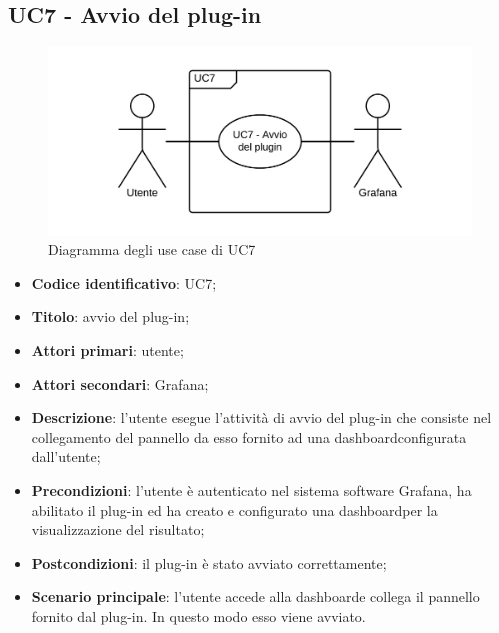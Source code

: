 \subsection{UC7 - Avvio del plug-in}
\begin{figure}[H]
	\includegraphics{img/UC7_-_Avvio_plugin.png}
	\caption{Diagramma degli use case di UC7}
\end{figure}
\begin{itemize}
	\item \textbf{Codice identificativo}: UC7;
	\item \textbf{Titolo}: avvio del plug-in;
	\item \textbf{Attori primari}: utente;
	\item \textbf{Attori secondari}: Grafana\glo;
	\item \textbf{Descrizione}: l'utente esegue l'attività di avvio del plug-in che consiste nel collegamento del pannello da esso fornito ad una dashboard\glosp configurata dall'utente;
	\item \textbf{Precondizioni}: l'utente è autenticato nel sistema software Grafana\glo, ha abilitato il plug-in ed ha creato e configurato una dashboard\glosp per la visualizzazione del risultato;
	\item \textbf{Postcondizioni}: il plug-in è stato avviato correttamente;
	\item \textbf{Scenario principale}: l'utente accede alla dashboard\glosp e collega il pannello fornito dal plug-in. In questo modo esso viene avviato.
\end{itemize}
